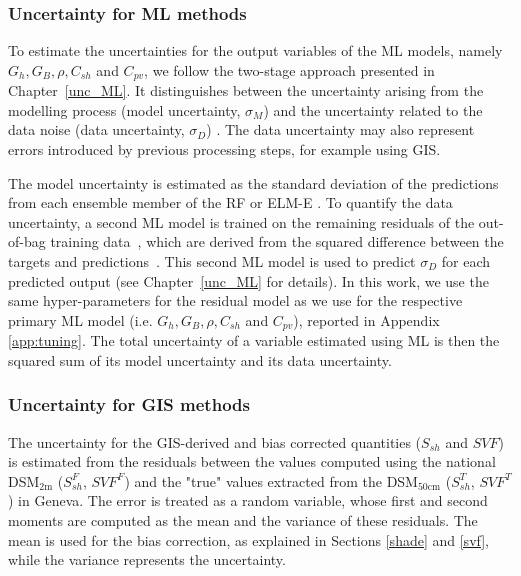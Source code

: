 \subsubsection{Uncertainty for ML methods}

To estimate the uncertainties for the output variables of the ML models, namely $G_h, G_B, \rho, C_{sh}$ and $C_{\mathit{pv}}$, we follow the two-stage approach presented in Chapter~\ref{unc_ML}. 
It distinguishes between the uncertainty arising from the modelling process (model uncertainty, $\sigma_M$) and the uncertainty related to the data noise (data uncertainty, $\sigma_D$) \cite{wan_probabilistic_2014}. 
The data uncertainty may also represent errors introduced by previous processing steps, for example using GIS. 

The model uncertainty is estimated as the standard deviation of the predictions from each ensemble member of the RF or ELM-E \cite{heskes_practical_1997, wan_probabilistic_2014}. 
To quantify the data uncertainty, a second ML model is trained on the remaining residuals of the out-of-bag training data~\cite{breiman_bagging_1996}, which are derived from the squared difference between the targets and predictions~\cite{heskes_practical_1997, wan_probabilistic_2014}. This second ML model is used to predict $\sigma_D$ for each predicted output (see Chapter~\ref{unc_ML} for details). In this work, we use the same hyper-parameters for the residual model as we use for the respective primary ML model (i.e. $G_h, G_B, \rho, C_{sh}$ and $C_{\mathit{pv}}$), reported in Appendix \ref{app:tuning}.
The total uncertainty of a variable estimated using ML is then the squared sum of its model uncertainty and its data uncertainty.

\subsubsection{Uncertainty for GIS methods}

The uncertainty for the GIS-derived and bias corrected quantities ($S_{sh}$ and $\mathit{SVF}$) is estimated from the residuals between the values computed using the national DSM$_{2\text{m}}$ ($S_{sh}^F$, $\mathit{SVF}^F$) and the "true" values extracted from the DSM$_{50\text{cm}}$ ($S_{sh}^T$, $\mathit{SVF}^T$) in Geneva.
The error is treated as a random variable, whose first and second moments are computed as the mean and the variance of these residuals. The mean is used for the bias correction, as explained in Sections \ref{shade} and \ref{svf}, while the variance represents the uncertainty.

